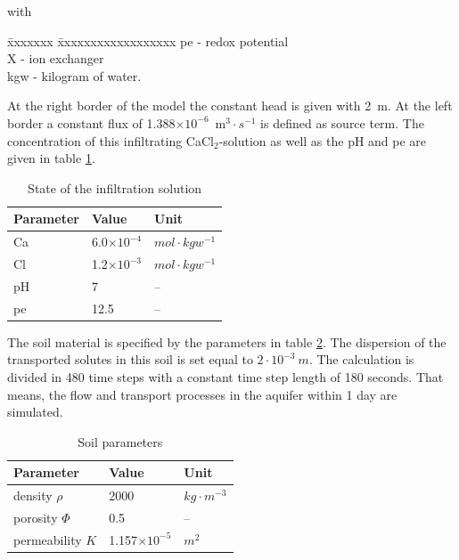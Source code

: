 {\small
with
\begin{tabbing}
\=xxxxxxx \=xxxxxxxxxxxxxxxxxx \kill
\> pe \> - redox potential \\
\> X \> - ion exchanger \\
\> kgw \> - kilogram of water. \\
\end{tabbing}
}

At the right border of the model the constant head is given with 2~m. At the left border a constant flux of 1.388$\times 10^{-6}$~m$^3\cdot s^{-1}$ is defined as source term. The concentration of this infiltrating CaCl$_2$-solution as well as the pH and pe are given in table \ref{tab:cationex_infil}.

\begin{table}[htbp]
\centering
\caption{State of the infiltration solution}
\begin{tabular}{lll}
\hline\noalign{\smallskip}
\hline
Parameter & Value & Unit \\
\hline
Ca & 6.0$\times 10^{-4}$ & $mol \cdot kgw^{-1}$ \\
Cl & 1.2$\times 10^{-3}$ & $mol \cdot kgw^{-1}$ \\
pH & 7 & -- \\
pe & 12.5 & -- \\
\hline
\end{tabular}
\label{tab:cationex_infil}
\end{table}

The soil material is specified by the parameters in table \ref{tab:cationex_soil}. The dispersion of the transported solutes in this soil is set equal to $2 \cdot 10^{-3}~m$. The calculation is divided in 480 time steps with a constant time step length of 180 seconds. That means, the flow and transport processes in the aquifer within 1 day are simulated.

\begin{table}[htbp]
\centering
\caption{Soil parameters}
\begin{tabular}{lll}
\hline\noalign{\smallskip}
\hline
Parameter & Value & Unit \\
\hline
density $\rho$  & 2000 & $ kg \cdot m^{-3}$  \\
porosity $\Phi$ & 0.5 & -- \\
permeability $K$ & 1.157$\times 10^{-5}$ & $m^2$ \\
\hline
\end{tabular}
\label{tab:cationex_soil}
\end{table}

